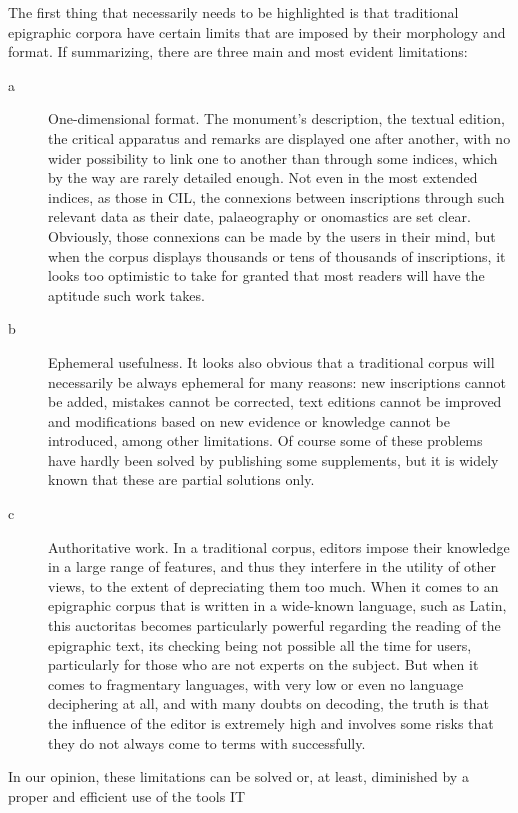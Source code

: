 \documentclass[amsthm,ebook]{saparticle}
\begin{document}
The first thing that necessarily needs to be highlighted is that traditional epigraphic corpora have certain limits that
are imposed by their morphology and format. If summarizing, there are three main and most evident limitations: 
\begin{description}
\item[a] One-dimensional format. The monument's description, the textual edition, the critical apparatus and remarks are
displayed one after another, with no wider possibility to link one to another than through some indices, which by the
way are rarely detailed enough. Not even in the most extended indices, as those in CIL, the connexions between
inscriptions through such relevant data as their date, palaeography or onomastics are set clear. Obviously, those
connexions can be made by the users in their mind, but when the corpus displays thousands or tens of thousands of
inscriptions, it looks too optimistic to take for granted that most readers will have the aptitude such work takes.

\item[b] Ephemeral usefulness. It looks also obvious that a traditional corpus will necessarily be always ephemeral for many
reasons: new inscriptions cannot be added, mistakes cannot be corrected, text editions cannot be improved and
modifications based on new evidence or knowledge cannot be introduced, among other limitations. Of course some of these
problems have hardly been solved by publishing some supplements, but it is widely known that these are partial
solutions only.

\item[c] Authoritative work. In a traditional corpus, editors impose their knowledge in a large range of features, and thus
they interfere in the utility of other views, to the extent of depreciating them too much. When it comes to an
epigraphic corpus that is written in a wide-known language, such as Latin, this auctoritas becomes particularly
powerful regarding the reading of the epigraphic text, its checking being not possible all the time for users,
particularly for those who are not experts on the subject. But when it comes to fragmentary languages, with very low or
even no language deciphering at all, and with many doubts on decoding, the truth is that the influence of the editor is
extremely high and involves some risks that they do not always come to terms with successfully.


\end{description}
In our opinion, these limitations can be solved or, at least, diminished by a proper and efficient use of the tools IT
\end{document}
